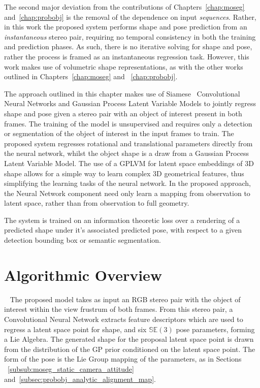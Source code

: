 The second major deviation from the contributions of Chapters~\ref{chap:moseg} and~\ref{chap:probobj} 
is the removal of the dependence on input \textit{sequences}. Rather, in this work 
the proposed system performs shape and pose prediction from an \textit{instantaneous}
stereo pair, requiring no temporal consistency in both the training and prediction 
phases. As such, there is no iterative solving for shape and pose, rather the process 
is framed as an instantaneous regression task. However, this work makes use of volumetric
shape representations, as with the other works outlined in Chapters~\ref{chap:moseg} and
~\ref{chap:probobj}.

The approach outlined in this chapter makes use of Siamese~\cite{SIAMESE} 
Convolutional Neural Networks and Gaussian Process Latent Variable Models to jointly regress 
shape and pose given a stereo pair with an object of interest present in both frames. The training of the 
model is unsupervised and requires only a detection or segmentation of the object of interest in the input 
frames to train. The proposed system regresses rotational and translational parameters directly 
from the neural network, whilst the object shape is a draw from a Gaussian Process 
Latent Variable Model. The use of a GPLVM for latent space embeddings of 3D shape 
allows for a simple way to learn complex 3D geometrical features, thus simplifying 
the learning tasks of the neural network. In the proposed approach, the Neural Network 
component need only learn a mapping from observation to latent space, rather than from observation 
to full geometry.

The system is trained on an information theoretic loss over a rendering of a predicted 
shape under it's associated predicted pose, with respect to a given detection bounding box 
or semantic segmentation. 

\section{Algorithmic Overview}
~\label{sec:spp_algorithm}
The proposed model takes as input an RGB stereo pair with the object of interest within the 
view frustrum of both frames. From this stereo pair, a Convolutional Neural Network extracts 
feature descriptors which are used to regress a latent space point for shape, and six 
\( \mathbb{SE}(3) \) pose parameters, forming a Lie Algebra. The generated shape for the proposal 
latent space point is drawn from the distribution of the GP prior conditioned on the latent space 
point. The form of the pose is the Lie Group mapping of the parameters, as in Sections
~\ref{subsub:moseg_static_camera_attitude} and~\ref{subsec:probobj_analytic_alignment_map}. 

